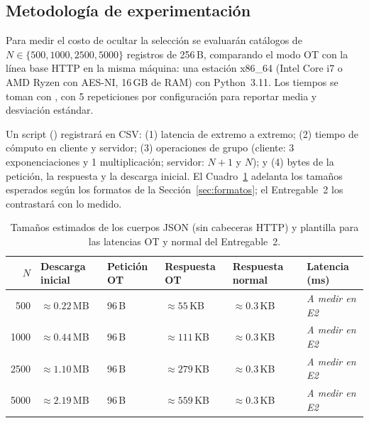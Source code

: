 \subsection{Metodolog\'ia de experimentaci\'on}
Para medir el costo de ocultar la selecci\'on se evaluar\'an cat\'alogos de
$N \in \{500, 1000, 2500, 5000\}$ registros de 256\,B, comparando el modo OT
con la l\'inea base HTTP en la misma m\'aquina: una estaci\'on x86\_64
(Intel Core i7 o AMD Ryzen con AES-NI, 16\,GB de RAM) con Python~3.11. Los
tiempos se toman con , con 5 repeticiones por
configuraci\'on para reportar media y desviaci\'on est\'andar.

Un script () registrar\'a en CSV: (1) latencia de extremo a
extremo; (2) tiempo de c\'omputo en cliente y servidor; (3) operaciones de
grupo (cliente: 3 exponenciaciones y 1 multiplicaci\'on; servidor: $N+1$ y
$N$); y (4) bytes de la petici\'on, la respuesta y la descarga inicial. El
Cuadro~\ref{tab:plantilla-experimentos} adelanta los tama\~nos esperados
seg\'un los formatos de la Secci\'on~\ref{sec:formatos}; el Entregable~2
los contrastar\'a con lo medido.

\begin{table}[ht]
\centering
\small
\begin{tabularx}{\textwidth}{@{}r X X X X X@{}}
\toprule
$N$ & Descarga inicial & Petici\'on OT & Respuesta OT & Respuesta normal & Latencia (ms) \\
\midrule
500  & $\approx 0.22$\,MB & 96\,B & $\approx 55$\,KB  & $\approx 0.3$\,KB & \emph{A medir en E2} \\
1000 & $\approx 0.44$\,MB & 96\,B & $\approx 111$\,KB & $\approx 0.3$\,KB & \emph{A medir en E2} \\
2500 & $\approx 1.10$\,MB & 96\,B & $\approx 279$\,KB & $\approx 0.3$\,KB & \emph{A medir en E2} \\
5000 & $\approx 2.19$\,MB & 96\,B & $\approx 559$\,KB & $\approx 0.3$\,KB & \emph{A medir en E2} \\
\bottomrule
\end{tabularx}
\caption{Tama\~nos estimados de los cuerpos JSON (sin cabeceras HTTP) y plantilla para las latencias OT y normal del Entregable~2.}
\label{tab:plantilla-experimentos}
\end{table}
